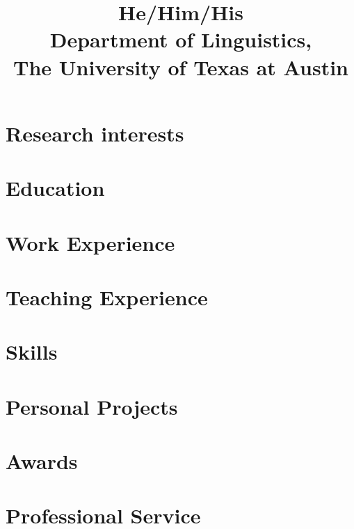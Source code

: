 \documentclass[11pt,a4paper]{mycv}
\title{He/Him/His\\Department of Linguistics,\\The University of Texas at Austin}
\begin{document}
\makecvtitle

\section{Research interests}


\section{Education}


\section{Work Experience}


\begingroup
\setlength\bibitemsep{1ex}
\printbibliography[title=Publications, nottype=talk]
\endgroup

\begingroup
\setlength\bibitemsep{1ex}
\printbibliography[title=Talks, type=talk]
\endgroup

\section{Teaching Experience}


\section{Skills}


\section{Personal Projects}


\section{Awards}


\section{Professional Service}

\end{document}
